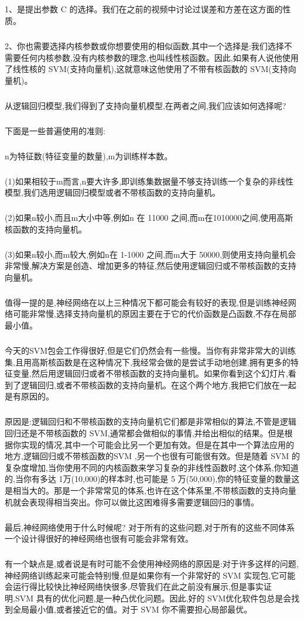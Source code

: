 \documentclass{article}
\begin{document}
\begin{CJK}{UTF8}{gbsn}
\subparagraph{}
1、是提出参数 C 的选择。我们在之前的视频中讨论过误差和方差在这方面的性质。
\subparagraph{}
2、你也需要选择内核参数或你想要使用的相似函数,其中一个选择是:我们选择不需要任何内核参数,没有内核参数的理念,也叫线性核函数。因此,如果有人说他使用了线性核的 SVM(支持向量机),这就意味这他使用了不带有核函数的 SVM(支持向量机)。
\subparagraph{}
从逻辑回归模型,我们得到了支持向量机模型,在两者之间,我们应该如何选择呢?
\begin{figure}[H]
\label{fig:753}
\end{figure}
\subparagraph{}
下面是一些普遍使用的准则:
\subparagraph{}
n为特征数(特征变量的数量),m为训练样本数。
\subparagraph{}
(1)如果相较于m而言,n要大许多,即训练集数据量不够支持训练一个复杂的非线性模型,我们选用逻辑回归模型或者不带核函数的支持向量机。
\subparagraph{}
(2)如果n较小,而且m大小中等,例如n 在 1\-{}1000 之间,而m在10\-{}10000之间,使用高斯核函数的支持向量机。
\subparagraph{}
(3)如果n较小,而m较大,例如n在 1-1000 之间,而m大于 50000,则使用支持向量机会非常慢,解决方案是创造、增加更多的特征,然后使用逻辑回归或不带核函数的支持向量机。
\subparagraph{}
值得一提的是,神经网络在以上三种情况下都可能会有较好的表现,但是训练神经网络可能非常慢,选择支持向量机的原因主要在于它的代价函数是凸函数,不存在局部最小值。
\subparagraph{}
今天的SVM包会工作得很好,但是它们仍然会有一些慢。当你有非常非常大的训练集,且用高斯核函数是在这种情况下,我经常会做的是尝试手动地创建,拥有更多的特征变量,然后用逻辑回归或者不带核函数的支持向量机。如果你看到这个幻灯片,看到了逻辑回归,或者不带核函数的支持向量机。在这个两个地方,我把它们放在一起是有原因的。
\subparagraph{}
原因是:逻辑回归和不带核函数的支持向量机它们都是非常相似的算法,不管是逻辑回归还是不带核函数的 SVM,通常都会做相似的事情,并给出相似的结果。但是根据你实现的情况,其中一个可能会比另一个更加有效。但是在其中一个算法应用的地方,逻辑回归或不带核函数的SVM ,另一个也很有可能很有效。但是随着 SVM 的复杂度增加,当你使用不同的内核函数来学习复杂的非线性函数时,这个体系,你知道的,当你有多达 1万(10,000)的样本时,也可能是 5 万(50,000),你的特征变量的数量这是相当大的。那是一个非常常见的体系,也许在这个体系里,不带核函数的支持向量机就会表现得相当突出。你可以做比这困难得多需要逻辑回归的事情。
\subparagraph{}
最后,神经网络使用于什么时候呢? 对于所有的这些问题,对于所有的这些不同体系一个设计得很好的神经网络也很有可能会非常有效。
\subparagraph{}
有一个缺点是,或者说是有时可能不会使用神经网络的原因是:对于许多这样的问题,神经网络训练起来可能会特别慢,但是如果你有一个非常好的 SVM 实现包,它可能会运行得比较快比神经网络快很多,尽管我们在此之前没有展示,但是事实证明,SVM 具有的优化问题,是一种凸优化问题。因此,好的 SVM优化软件包总是会找到全局最小值,或者接近它的值。对于 SVM 你不需要担心局部最优。

\end{CJK}
\end{document}
